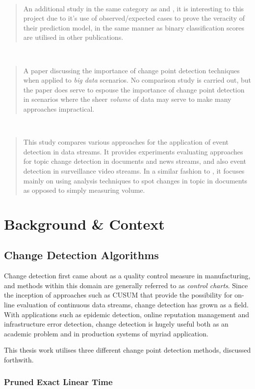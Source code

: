 \documentclass{uvamscse}	%
\newcommand{\acite}[2]{
\noindent\cite{#1}~\parbox[t]{\linewidth-17.8pt}{\vspace{-.65em}\textbf{\fullcite{#1}}}\begin{quote}#2\end{quote}
}
\begin{document}
\acite{Kulldorff2005}{
    An additional study in the same category as \cite{Ginsberg2009} and \cite{Pelecanos2010}, it is interesting to this project due to it's use of observed/expected cases to prove the veracity of their prediction model, in the same manner as binary classification scores are utilised in other publications.
}

\acite{Tran2014}{
    A paper discussing the importance of change point detection techniques when applied to \emph{big data} scenarios. No comparison study is carried out, but the paper does serve to espouse the importance of change point detection in scenarios where the sheer \emph{volume} of data may serve to make many approaches impractical.
}

\acite{Xu2011}{
    This study compares various approaches for the application of event detection in data streams. It provides experiments evaluating approaches for topic change detection in documents and news streams, and also event detection in surveillance video streams. In a similar fashion to \cite{Alvanaki2011}, it focuses mainly on using analysis techniques to spot changes in topic in documents as opposed to simply measuring volume. 
}


\chapter{Background \& Context}

\section{Change Detection Algorithms}

Change detection first came about as a quality control measure in manufacturing, and methods within this domain are generally referred to as \emph{control charts}. Since the inception of approaches such as CUSUM \cite{Page1954} that provide the possibility for on-line evaluation of continuous data streams, change detection has grown as a field. With applications such as epidemic detection, online reputation management and infrastructure error detection, change detection is hugely useful both as an academic problem and in production systems of myriad application.

This thesis work utilises three different change point detection methods, discussed forthwith.

\subsection{Pruned Exact Linear Time}
\end{document}
